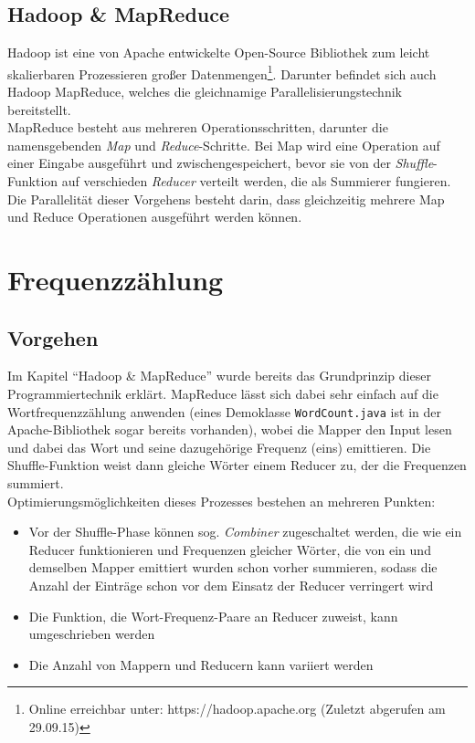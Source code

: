 \documentclass[a4paper,12pt]{scrartcl}
\begin{document}
    \subsection{Hadoop \& MapReduce}

    Hadoop ist eine von Apache entwickelte Open-Source Bibliothek zum leicht skalierbaren Prozessieren großer Datenmengen\footnote{Online erreichbar unter: https://hadoop.apache.org (Zuletzt abgerufen am 29.09.15)}. Darunter befindet sich auch Hadoop MapReduce, welches die gleichnamige Parallelisierungstechnik bereitstellt. \\
    MapReduce besteht aus mehreren Operationsschritten, darunter die namensgebenden \emph{Map} und \emph{Reduce}-Schritte. Bei Map wird eine Operation auf einer Eingabe ausgeführt und zwischengespeichert, bevor sie von der \emph{Shuffle}-Funktion auf verschieden \emph{Reducer} verteilt werden, die als Summierer fungieren. Die Parallelität dieser Vorgehens besteht darin, dass gleichzeitig mehrere Map und Reduce Operationen ausgeführt werden können. 

\section{Frequenzzählung}

    \subsection{Vorgehen}

    Im Kapitel ``Hadoop \& MapReduce'' wurde bereits das Grundprinzip dieser Programmiertechnik erklärt. MapReduce lässt sich dabei sehr einfach auf die Wortfrequenzzählung anwenden (eines Demoklasse {\tt WordCount.java} ist in der Apache-Bibliothek sogar bereits vorhanden), wobei die Mapper den Input lesen und dabei das Wort und seine dazugehörige Frequenz (eins) emittieren. Die Shuffle-Funktion weist dann gleiche Wörter einem Reducer zu, der die Frequenzen summiert. \\
    Optimierungsmöglichkeiten dieses Prozesses bestehen an mehreren Punkten:
    \begin{itemize}
        \item Vor der Shuffle-Phase können sog. \emph{Combiner} zugeschaltet werden, die wie ein Reducer funktionieren und Frequenzen gleicher Wörter, die von ein und demselben Mapper emittiert wurden schon vorher summieren, sodass die Anzahl der Einträge schon vor dem Einsatz der Reducer verringert wird
        \item Die Funktion, die Wort-Frequenz-Paare an Reducer zuweist, kann umgeschrieben werden
        \item Die Anzahl von Mappern und Reducern kann variiert werden
    \end{itemize}
\end{document}
